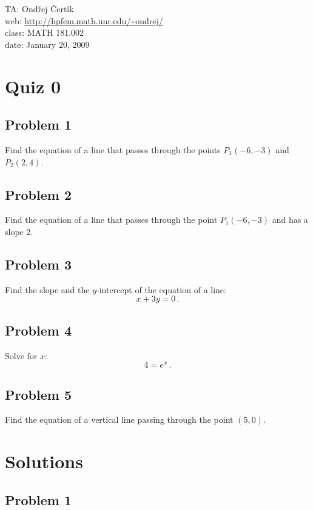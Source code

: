 \documentclass[10pt]{article}
\begin{document}
\noindent TA: Ondřej Čertík\\
web: \url{http://hpfem.math.unr.edu/~ondrej/}\\
class: MATH 181.002\\
date: January 20, 2009

\section*{Quiz 0}

\subsection*{Problem 1}

Find the equation of a line that passes through the points $P_1(-6, -3)$ and
$P_2(2, 4)$.

\subsection*{Problem 2}

Find the equation of a line that passes through the point $P_1(-6, -3)$ and has
a slope 2.

\subsection*{Problem 3}

Find the slope and the $y$-intercept of the equation of a line:
$$x+3y=0\,.$$

\subsection*{Problem 4}

Solve for $x$:
$$4=e^x\,.$$

\subsection*{Problem 5}

Find the equation of a vertical line passing through the point $(5, 0)$.

\section*{Solutions}

\subsection*{Problem 1}
\end{document}
